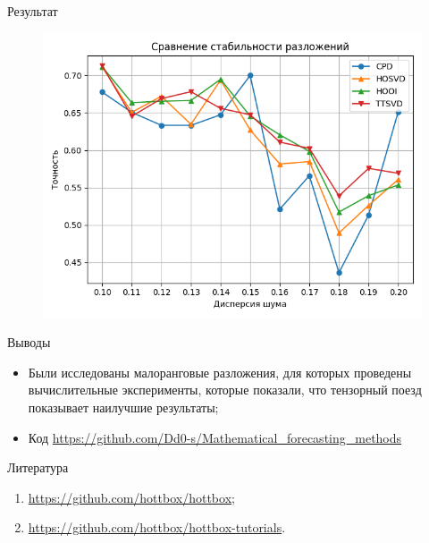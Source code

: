 \documentclass{beamer}
\begin{document}

\begin{frame}{Результат}

    \begin{figure}
        \centering
        \includegraphics[width = \textwidth]{images/stab.png}
    \end{figure}
  
\end{frame}


\begin{frame}{Выводы}
    \begin{itemize}
        \item Были исследованы малоранговые разложения, для которых проведены вычислительные эксперименты, которые показали, что тензорный поезд показывает наилучшие результаты;
        \item Код \url{https://github.com/Dd0-s/Mathematical_forecasting_methods}
    \end{itemize}
\end{frame}


\begin{frame}{Литература}

    \begin{enumerate}
        \item \url{https://github.com/hottbox/hottbox};
        \item \url{https://github.com/hottbox/hottbox-tutorials}.
    \end{enumerate}
    
\end{frame}

\end{document}
